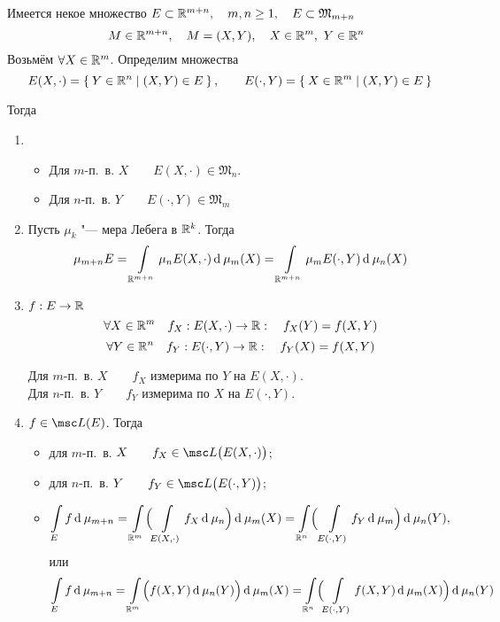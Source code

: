 \begin{theorem}
	Имеется некое множество $ E \subset \mathbb{R}^{m + n}, \quad m, n \ge 1, \quad E \subset \mathfrak M_{m + n} $
	$$ \quad M \in \mathbb{R}^{m + n}, \quad M = (X, Y), \quad X \in \mathbb{R}^m, ~ Y \in \mathbb{R}^n $$
	Возьмём $ \forall X \in \mathbb{R}^m $. Определим множества
	$$ E (X, \cdot) = \Set{ Y \in \ensuremath{\mathbb{R}}^n \mid (X, Y) \in E}, \qquad E(\cdot, Y) = \Set{X \in \ensuremath{\mathbb{R}}^m \mid (X, Y) \in E} $$

	Тогда
	\begin{enumerate}
		\item
			\begin{itemize}
			\item Для $ m $-п.~в. $ X \qquad E(X, \cdot) \in \mathfrak M_n $.
			\item Для $ n $-п.~в. $ Y \qquad E(\cdot, Y) \in \mathfrak M_m $
		\end{itemize}
		\item Пусть $ \mu_k $ "--- мера Лебега в $ \mathbb{R}^k $. Тогда
			$$ \mu_{m + n} E = \int\limits_{\mathbb{R}^{m + n}} \mu_n E(X, \cdot) \operatorname{d}^{} \mu_m(X) = \int\limits_{\mathbb{R}^{m + n}} \mu_m E(\cdot, Y) \operatorname{d}^{} \mu_n(X) $$
		\item $ f : E \to \mathbb{R} $
			$$ \forall X \in \mathbb{R}^m \quad f_X : E(X, \cdot) \to \mathbb{R} : \quad f_X(Y) = f(X, Y) $$
			$$ \forall Y \in \mathbb{R}^n \quad f_Y : E(\cdot, Y) \to \mathbb{R} : \quad f_Y(X) = f(X, Y) $$

			Для $ m $-п.~в. $ X \qquad f_X $ измерима по $ Y $ на $ E(X, \cdot) $. \\
			Для $ n $-п.~в. $ Y \qquad f_Y $ измерима по $ X $ на $ E(\cdot, Y) $.
			
		\item $ f \in \msc L(E) $. Тогда
			\begin{itemize}
				\item для $ m $-п.~в. $ X \qquad f_X \in \msc L \bigl( E(X, \cdot) \bigr) $;
				\item для $ n $-п.~в. $ Y \qquad f_Y \in \msc L \bigl( E(\cdot, Y) \bigr) $;
				\item
					$$ \int\limits_E f \operatorname{d}^{} \mu_{m + n} = \int\limits_{\mathbb{R}^m} \Bigl( \int\limits_{E(X, \cdot)} f_X \operatorname{d}^{} \mu_n \Bigr) \operatorname{d}^{} \mu_m(X) = \int\limits_{\mathbb{R}^n} \Bigr(\int\limits_{E(\cdot, Y)} f_Y \operatorname{d}^{} \mu_m \Bigr) \operatorname{d}^{} \mu_n(Y), $$
					или
					$$ \int\limits_E f \operatorname{d}^{} \mu_{m + n} = \int\limits_{\mathbb{R}^m} \Bigl( f(X, Y) \operatorname{d}^{} \mu_n(Y) \Bigr) \operatorname{d}^{} \mu_m(X) = \int\limits_{\mathbb{R}^n} \Bigl( \int\limits_{E(\cdot, Y)} f(X, Y) \operatorname{d}^{} \mu_m(X) \Bigr) \operatorname{d}^{} \mu_n(Y) $$
			\end{itemize}
	\end{enumerate}
\end{theorem}

